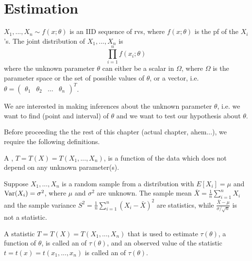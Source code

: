 \documentclass[notoc,notitlepage]{tufte-book}
\begin{document}
\section{Estimation}%
\label{sec:estimation}

 $X_1, ..., X_n \sim f(x; \theta)$ is an IID sequence of rvs, where $f(x; \theta)$ is the pf of the $X_i$'s. The joint distribution of $X_1, ..., X_n$ is
\begin{equation*}
  \prod_{i=1}^{n} f(x_i; \theta)
\end{equation*}
where the unknown parameter $\theta$ can either be a scalar in $\Omega$, where $\Omega$ is the parameter space or the set of possible values of $\theta$, or a vector, i.e. $\theta = \begin{pmatrix} \theta_1 & \theta_2 & \hdots & \theta_n \end{pmatrix}^T$.

We are interested in making inferences about the unknown parameter $\theta$, i.e. we want to find  (point and interval) of $\theta$ and we want to test our hypothesis about $\theta$.

Before proceeding the the rest of this chapter (actual chapter, ahem...), we require the following definitions.

\begin{defn}[Statistic]
\label{defn:statistic}
  A , $T = T(X) = T(X_1, ..., X_n)$, is a function of the data which does not depend on any unknown parameter(s).
\end{defn}

\begin{eg}
  Suppose $X_1, ..., X_n$ is a random sample from a distribution with $E[X_i] = \mu$ and $\operatorname{Var}(X_i) = \sigma^2$, where $\mu$ and $\sigma^2$ are unknown. The sample mean $\bar{X} = \frac{1}{n} \sum_{i=1}^{n} X_i$ and the sample variance $S^2 = \frac{1}{n} \sum_{i=1}^{n} (X_i - \bar{X})^2$ are statistics, while $\frac{\bar{X} - \mu}{\sigma / \sqrt{n}}$ is not a statistic.
\end{eg}

\begin{defn}
\label{defn:estimator}
A statistic $T = T(X) = T(X_1, ..., X_n)$ that is used to estimate $\tau(\theta)$, a function of $\theta$, is called an  of $\tau(\theta)$, and an observed value of the statistic $t = t(x) = t(x_1, ..., x_n)$ is called an  of $\tau(\theta)$.
\end{defn}
\end{document}
